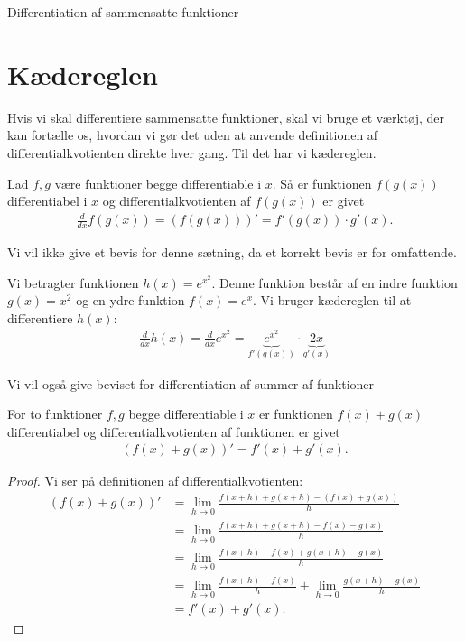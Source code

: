 

\begin{center}
\Huge
Differentiation af sammensatte funktioner
\end{center}
\section*{Kædereglen}

Hvis vi skal differentiere sammensatte funktioner, skal vi bruge et værktøj, der kan fortælle os, hvordan vi gør det uden at anvende definitionen af differentialkvotienten direkte hver gang. Til det har vi kædereglen.
\begin{setn}[Kædereglen]
Lad $f,g$ være funktioner begge differentiable i $x$. Så er funktionen $f(g(x))$ differentiabel i $x$ og 
differentialkvotienten af $f(g(x))$ er givet
\begin{align*}
\frac{d}{dx}f(g(x)) = (f(g(x)))' = f'(g(x))\cdot g'(x).
\end{align*}
\end{setn}
Vi vil ikke give et bevis for denne sætning, da et korrekt bevis er for omfattende. 
\begin{exa}
Vi betragter funktionen $h(x) = e^{x^2}$. Denne funktion består af en indre funktion $g(x)=x^2$ og en ydre funktion $f(x)=e^x$. Vi bruger kædereglen til at differentiere $h(x)$:
\begin{align*}
\frac{d}{d x} h(x) = \frac{d}{dx}e^{x^2} = \underbrace{e^{x^2}}_{f'(g(x))}\cdot \underbrace{2x}_{g'(x)}
\end{align*}
\end{exa}
Vi vil også give beviset for differentiation af summer af funktioner
\begin{setn}
For to funktioner $f,g$ begge differentiable i $x$ er funktionen $f(x)+g(x)$ differentiabel og differentialkvotienten af funktionen er givet
\begin{align*}
(f(x)+g(x))' = f'(x)+g'(x).
\end{align*}
\end{setn}
\begin{proof}
Vi ser på definitionen af differentialkvotienten:
\begin{align*}
(f(x)+g(x))' &= \lim_{h\to 0} \frac{f(x+h)+g(x+h)-(f(x)+g(x))}{h}\\
&= \lim_{h\to 0} \frac{f(x+h)+g(x+h)-f(x)-g(x)}{h}\\
&=\lim_{h\to 0} \frac{f(x+h) -f(x) + g(x+h)-g(x)}{h}\\
&= \lim_{h\to 0}\frac{f(x+h)-f(x)}{h} + \lim_{h\to 0} \frac{g(x+h)-g(x)}{h}\\
&= f'(x)+g'(x).
\end{align*}
\end{proof}
